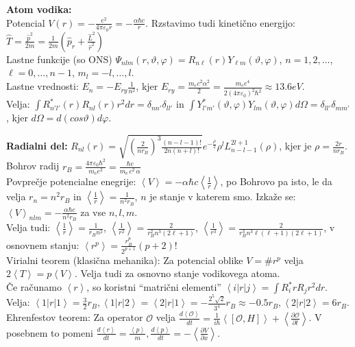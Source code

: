 \documentclass[a4paper, oneside, 12pt]{article}
\theoremstyle{definition}
\newcommand{\eps}{\varepsilon}
\begin{document}
\textbf{Atom vodika:} \\
Potencial $V(r) = -\frac{e^2}{4\pi\eps_0r} = - \frac{\alpha \hbar c}{r}$. Rzstavimo tudi kinetično energijo:
$\hat{T} = \frac{\hat{p}^2}{2m} = \frac{1}{2m}(\hat{p}_r + \frac{\hat{L}^2}{\hat{r}^2})$ \\
Lastne funkcije (so ONS) $\Psi_{nlm}(r,\vartheta, \varphi) = R_{n\ell}(r) Y_{\ell m}(\vartheta, \varphi)$, $n = 1, 2, \ldots$, $\ell = 0, \ldots, n-1$, $m_l = -l, \ldots, l$. \\
Lastne  vrednosti: $E_n = - E_{ry} \frac{1}{n^2}$, kjer $E_{ry} = \frac{m_e c^2 \alpha^2}{2} = \frac{ m_e e^4}{2 ( 4 \pi \eps_0)^2 \hbar^2 } \approx 13.6 eV$.\\
Velja: $\int R_{n' l'}^*(r) R_{nl}(r) r^2 dr = \delta_{n n'} \delta_{l l'}$ in $\int Y_{l' m'}^*(\vartheta, \varphi) Y_{lm}(\vartheta, \varphi) d\Omega = \delta_{l l'} \delta_{m m'}$, kjer $d\Omega = d(cos\vartheta) d\varphi$.

\textbf{Radialni del:} $R_{n l}(r) = \sqrt{(\frac{2}{n r_B})^3 \frac{(n-l-1)!}{2n(n+l)!}} e^{-\frac{\rho}{2}} \rho^l L_{n-l-1}^{2l+1}(\rho)$, kjer je $\rho = \frac{2r}{n r_B}$.\\
Bohrov radij $r_B = \frac{4 \pi \varepsilon_0 \hbar^2}{m_{\mathrm{e}} e^2} =
\frac{\hbar c}{m_{\mathrm{e}}\,c^2\,\alpha}$\\
Povprečje potencialne enegrije: $\left\langle V\right\rangle = - \alpha \hbar c \left\langle \frac{1}{r}\right\rangle$, po Bohrovo pa isto, le da velja $r_n = n^2 r_B$ in $\left\langle \frac{1}{r}\right\rangle = \frac{1}{n^2 r_B}$, $n$ je stanje v katerem smo. Izkaže se: $\left\langle V\right\rangle_{nlm} = -\frac{\alpha \hbar c}{n^2 r_B}$ za vse $n,l,m$.\\
Velja tudi:
$\left\langle \frac{1}{r}\right\rangle = \frac{1}{r_Bn^2}$,
$\left\langle \frac{1}{r^2}\right\rangle = \frac{2}{r_B^2n^3(2\ell+1)}$,
$\left\langle \frac{1}{r^3}\right\rangle = \frac{2}{r_B^3n^3\ell(\ell+1)(2\ell+1)}$,
v osnovnem stanju: $\left\langle r^p\right\rangle = \frac{r_B^p}{2^{p+1}} (p+2)!$\\
Virialni teorem (klasična mehanika): Za potencial oblike $V = \# r^p$ velja $2 \left\langle T\right\rangle = p \left\langle V\right\rangle$. Velja tudi za osnovno stanje vodikovega atoma.\\
Če računamo $\left\langle r\right\rangle$, so koristni ``matrični elementi'' $\left\langle i|r|j\right\rangle = \int R_i^* r R_j r^2 dr$. Velja: $\left\langle 1|r|1\right\rangle = \frac{3}{2}r_B, \left\langle 1|r|2\right\rangle = \left\langle 2|r|1\right\rangle = - \frac{2^5 \sqrt{2}}{3^4} r_B \approx - 0.5 r_B, \left\langle 2|r|2\right\rangle = 6 r_B$.\\
Ehrenfestov teorem: Za operator $\mathcal{O}$ velja $\frac{d \left\langle \mathcal{O}\right\rangle}{dt} = \frac{1}{i\hbar} \left\langle [\mathcal{O}, H]\right\rangle + \left\langle \frac{\partial \mathcal{O}}{\partial t}\right\rangle$. V posebnem to pomeni $\frac{d\left\langle r\right\rangle}{dt} = \frac{\left\langle p\right\rangle}{m}, \frac{d \left\langle p\right\rangle}{dt} = -\left\langle \frac{\partial V}{\partial x}\right\rangle$.
\end{document}
